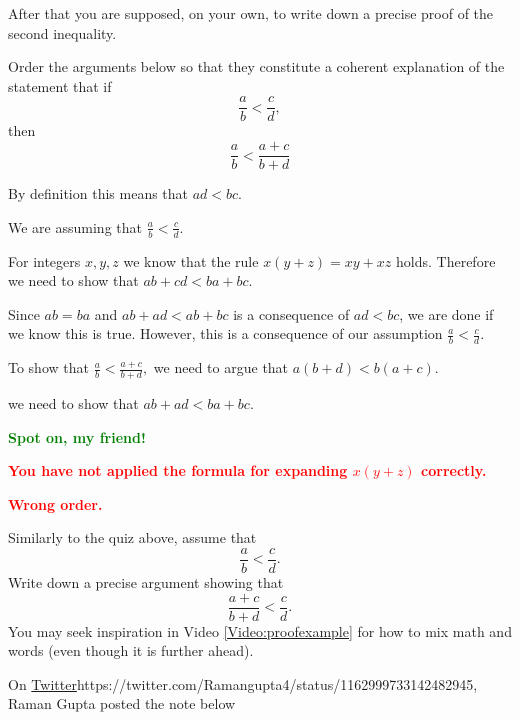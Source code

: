 \documentclass{article}
\newcommand{\red}[1]{\textcolor{red}{\textbf{#1}}}
\newcommand{\green}[1]{\textcolor{green}{\textbf{#1}}}
\begin{document}
After that you are supposed, on your own, to write down a precise proof of
the second inequality.

\begin{quizexercise}[showhide]
\begin{orderquiz}
  \question
  Order the arguments below so that they constitute a coherent explanation of the
  statement that if
  $$
  \frac{a}{b} < \frac{c}{d},
  $$
  then
  $$
  \frac{a}{b} < \frac{a + c}{b + d}
  $$

  
  \answer %
  By definition this means that $a d < b c$.

  
  
 \answer %
  We are assuming that $\frac{a}{b} < \frac{c}{d}$. 

  \answer %
  For integers $x, y, z$ we know that the rule
  $
  x ( y + z) = x y + x z
  $
  holds. Therefore
  \answer %
  we need to show that $a b + c d < b a + b c$.

  
  \answer %
  Since $a b = b a$ and $a b + a d < a b + b c$ is a consequence of $a d < b c$, we are
  done if we know this is true.
  \answer %
  However, this is a consequence of our assumption $\frac{a}{b} < \frac{c}{d}$.

\answer %
  To show that
  $
  \frac{a}{b} < \frac{a+c}{b + d},
  $
  we need to argue that $a (b + d) < b (a + c)$.

  
  \answer

  we need to show that $a b + a d < b a + b c$.
  

  \green{Spot on, my friend!}

  \red{You have not applied the formula for expanding $x(y + z)$ correctly.}

  \red{Wrong order.}

\end{orderquiz}
\end{quizexercise}




\beginshex
Similarly to the quiz above, assume that  
$$
  \frac{a}{b} < \frac{c}{d}.
  $$
  Write down a precise argument showing that
  $$
  \frac{a + c}{b + d} < \frac{c}{d}.
  $$
  You may seek inspiration in Video \ref{Video:proofexample} for
  how to mix math and words (even though
  it is further ahead).
  \endshex

  
  

\beginshex
On \url{Twitter}{https://twitter.com/Ramangupta4/status/1162999733142482945}, Raman Gupta posted the note below
\end{document}
